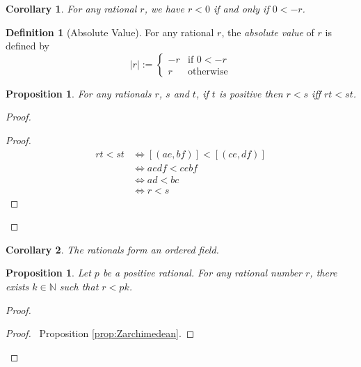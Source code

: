 \documentclass{book}
\let\qed\relax
\newtheorem{prop}[ax]{Proposition}
\newtheorem{cor}{Corollary}[ax]
\theoremstyle{definition}
\newtheorem{df}[ax]{Definition}
\begin{document}
\begin{cor}
For any rational $r$, we have $r < 0$ if and only if $0 < -r$.
\end{cor}

\begin{df}[Absolute Value]
For any rational $r$, the \emph{absolute value} of $r$ is defined by
\[ |r| := \begin{cases}
-r & \text{if } 0 < -r \\
r & \text{otherwise}
\end{cases} \]
\end{df}

\begin{prop}
For any rationals $r$, $s$ and $t$, if $t$ is positive then $r < s$ iff $rt < st$.
\end{prop}

\begin{proof}
\pf
{}
\begin{proof}
	\pf
	\begin{align*}
		rt < st & \Leftrightarrow [(ae,bf)] < [(ce,df)]  \\
		& \Leftrightarrow aedf < cebf \\
		& \Leftrightarrow ad < bc \\
		& \Leftrightarrow r < s
	\end{align*}
\end{proof}
\qed
\end{proof}

\begin{cor}
The rationals form an ordered field.
\end{cor}

\begin{prop}
\label{prop:Qarchimedean}
Let $p$ be a positive rational. For any rational number $r$, there exists $k \in \mathbb{N}$ such that $r < pk$.
\end{prop}

\begin{proof}
\pf
{}
\begin{proof}
	\pf\ Proposition \ref{prop:Zarchimedean}.
\end{proof}
\qed
\end{proof}
\end{document}
